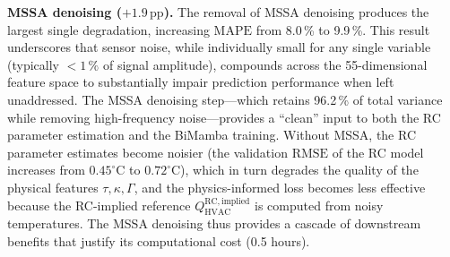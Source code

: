 \documentclass[11pt]{article}
\providecommand{\pp}{\,\text{pp}}
\providecommand{\RMSE}{\text{RMSE}}
\providecommand{\MAPE}{\text{MAPE}}
\begin{document}
\par\noindent\hspace*{2em}\textbf{MSSA denoising ($+1.9\pp$).} The removal of MSSA denoising produces the largest single degradation, increasing $\MAPE$ from 8.0\,\% to 9.9\,\%. This result underscores that sensor noise, while individually small for any single variable (typically $<1\,\%$ of signal amplitude), compounds across the 55-dimensional feature space to substantially impair prediction performance when left unaddressed. The MSSA denoising step—which retains 96.2\,\% of total variance while removing high-frequency noise—provides a ``clean'' input to both the RC parameter estimation and the BiMamba training. Without MSSA, the RC parameter estimates become noisier (the validation $\RMSE$ of the RC model increases from $0.45^\circ\text{C}$ to $0.72^\circ\text{C}$), which in turn degrades the quality of the physical features $\tau,\kappa,\Gamma$, and the physics-informed loss becomes less effective because the RC-implied reference $Q_{\mathrm{HVAC}}^{\mathrm{RC,implied}}$ is computed from noisy temperatures. The MSSA denoising thus provides a cascade of downstream benefits that justify its computational cost (0.5 hours).
\begin{table}[!htbp]
\centering
\caption{Detailed prediction performance with and without the physics-informed loss}
\label{tab:physics_loss_detail}
\end{table}
\end{document}
